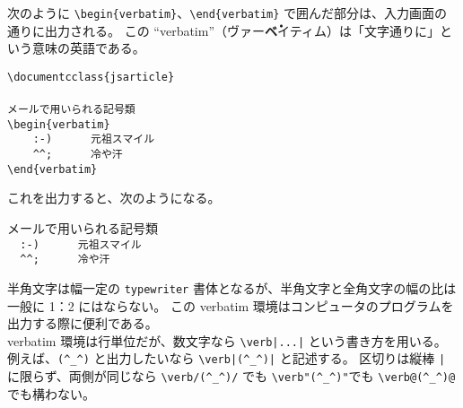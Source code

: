 次のように \verb'\begin{verbatim}'、\verb'\end{verbatim}' で囲んだ部分は、入力画面の通りに出力される。
この ``verbatim''（ヴァー\textbf{\.{ベ}}イティム）は「文字通りに」という意味の英語である。
\begin{mdframed}[roundcorner=0.50zw,leftmargin=3.00zw,rightmargin=3.00zw,skipabove=0.40zw,skipbelow=0.40zw,innertopmargin=4.00pt,innerbottommargin=4.00pt,innerleftmargin=5.00pt,innerrightmargin=5.00pt,linecolor=gray!020,linewidth=0.50pt,backgroundcolor=gray!20]
  \verb'\documentcclass{jsarticle}' \\
  \verb''           \\
  \verb'メールで用いられる記号類'   \\
  \verb'\begin{verbatim}'           \\
  \verb'    :-)      元祖スマイル'  \\
  \verb'    ^^;      冷や汗'        \\
  \verb'\end{verbatim}'             \\
  \verb''
\end{mdframed}
これを出力すると、次のようになる。
\begin{mdframed}[roundcorner=0.50zw,leftmargin=3.00zw,rightmargin=3.00zw,skipabove=0.40zw,skipbelow=0.40zw,innertopmargin=4.00pt,innerbottommargin=4.00pt,innerleftmargin=5.00pt,innerrightmargin=5.00pt,linecolor=gray!100,linewidth=0.50pt,backgroundcolor=gray!00]
  メールで用いられる記号類       \\
  \verb'  :-)      元祖スマイル' \\
  \verb'  ^^;      冷や汗'
\end{mdframed}
半角文字は幅一定の \texttt{typewriter} 書体となるが、半角文字と全角文字の幅の比は一般に 1：2 にはならない。
この verbatim 環境はコンピュータのプログラムを出力する際に便利である。\\

verbatim 環境は行単位だが、数文字なら \verb'\verb|...|' という書き方を用いる。
例えば、\verb'(^_^)' と出力したいなら \verb'\verb|(^_^)|' と記述する。
区切りは縦棒 \verb'|' に限らず、両側が同じなら \verb'\verb/(^_^)/' でも \verb'\verb"(^_^)"'でも \verb'\verb@(^_^)@' でも構わない。\\

